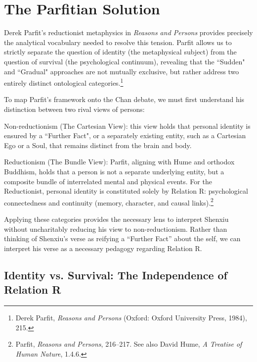 \section{The Parfitian Solution}

Derek Parfit's reductionist metaphysics in \emph{Reasons and Persons}
provides precisely the analytical vocabulary needed to resolve this
tension. Parfit allows us to strictly separate the question of identity
(the metaphysical subject) from the question of survival (the
psychological continuum), revealing that the ``Sudden" and ``Gradual"
approaches are not mutually exclusive, but rather address two entirely
distinct ontological categories.\footnote{Derek Parfit, \emph{Reasons
  and Persons} (Oxford: Oxford University Press, 1984), 215.}

To map Parfit's framework onto the Chan debate, we must first understand
his distinction between two rival views of persons:

\vspace{0.5em}
\noindent Non-reductionism (The Cartesian View): this view holds that personal
identity is ensured by a ``Further Fact", or a separately existing
entity, such as a Cartesian Ego or a Soul, that remains distinct from
the brain and body.

\vspace{0.5em}
\noindent Reductionism (The Bundle View): Parfit, aligning with Hume and orthodox
Buddhism, holds that a person is not a separate underlying entity, but a
composite bundle of interrelated mental and physical events. For the
Reductionist, personal identity is constituted solely by Relation R:
psychological connectedness and continuity (memory, character, and
causal links).\footnote{Parfit, \emph{Reasons and Persons}, 216--217.
  See also David Hume, \emph{A Treatise of Human Nature}, 1.4.6.}

\vspace{0.5em}
\noindent Applying these categories provides the necessary lens to interpret
Shenxiu without uncharitably reducing his view to non-reductionism.
Rather than thinking of Shenxiu's verse as reifying a ``Further Fact''
about the self, we can interpret his verse as a necessary pedagogy
regarding Relation R.

\subsection{Identity vs. Survival: The Independence of Relation R}

